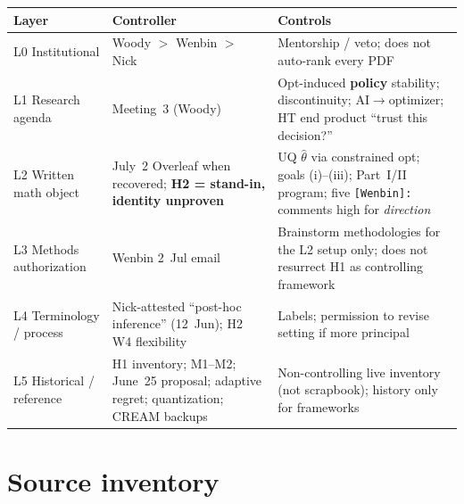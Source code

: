 \documentclass[11pt]{article}
\begin{document}
\begin{center}
\begin{tabularx}{\linewidth}{@{}l >{\RaggedRight\arraybackslash}X
  >{\RaggedRight\arraybackslash}X@{}}
\toprule
\textbf{Layer} & \textbf{Controller} & \textbf{Controls} \\
\midrule
L0 Institutional & Woody $>$ Wenbin $>$ Nick &
  Mentorship / veto; does not auto-rank every PDF \\
\addlinespace
L1 Research agenda & Meeting~3 (Woody) &
  Opt-induced \textbf{policy} stability; discontinuity; AI$\to$optimizer;
  HT end product ``trust this decision?'' \\
\addlinespace
L2 Written math object & July~2 Overleaf when recovered;
  \textbf{H2 = stand-in, identity unproven} &
  UQ $\hat\theta$ via constrained opt; goals (i)--(iii); Part~I/II program;
  five \texttt{[Wenbin]:} comments high for \emph{direction} \\
\addlinespace
L3 Methods authorization & Wenbin 2~Jul email &
  Brainstorm methodologies for the L2 setup only;
  does not resurrect H1 as controlling framework \\
\addlinespace
L4 Terminology / process & Nick-attested ``post-hoc inference'' (12~Jun);
  H2 W4 flexibility &
  Labels; permission to revise setting if more principal \\
\addlinespace
L5 Historical / reference & H1 inventory; M1--M2; June~25 proposal;
  adaptive regret; quantization; CREAM backups &
  Non-controlling live inventory (not scrapbook); history only for frameworks \\
\bottomrule
\end{tabularx}
\end{center}

\medskip
\noindent{}

\section{Source inventory}
\end{document}
